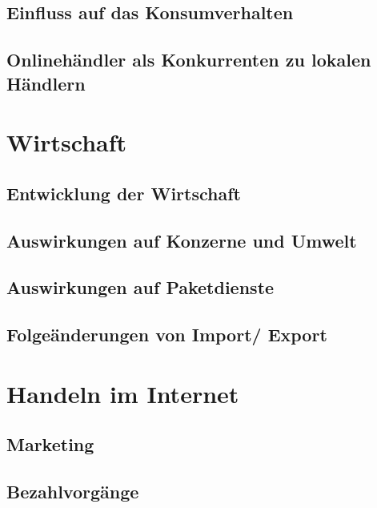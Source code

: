 \documentclass[a4paper, 12pt]{scrartcl}
\begin{document}
        \subsection{Einfluss auf das Konsumverhalten } %
            
            
        \subsection{Onlinehändler als Konkurrenten zu lokalen Händlern}
            
            
        
    \section{Wirtschaft} %
        \subsection{Entwicklung der Wirtschaft}
        \subsection{Auswirkungen auf Konzerne und Umwelt}
        \subsection{Auswirkungen auf Paketdienste}
        \subsection{Folgeänderungen von Import/ Export}
        
    \section{Handeln im Internet}
        \subsection{Marketing}
            
        \subsection{Bezahlvorgänge}
            
        \newpage
    
    \newpage
    \listoffigures
    \newpage
    \listoftables
\end{document}
